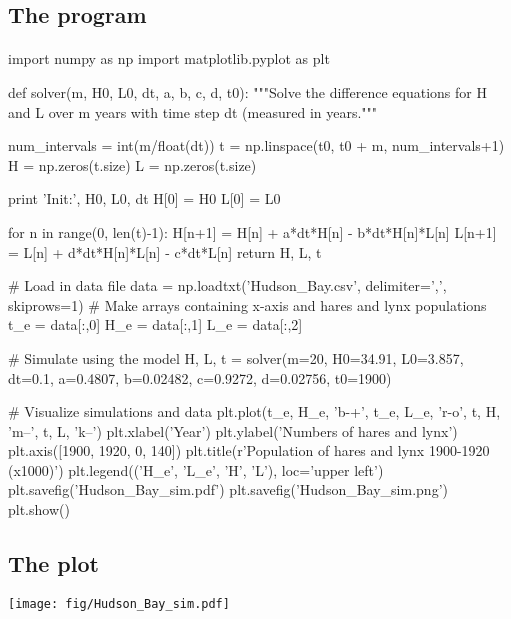 \documentclass[%
twoside,                 %
final,                   %
10pt]{article}
\begin{document}
\noindent



\subsection{The program}


\paragraph{}
\bpypro
import numpy as np
import matplotlib.pyplot as plt

def solver(m, H0, L0, dt, a, b, c, d, t0):
    """Solve the difference equations for H and L over m years
    with time step dt (measured in years."""

    num_intervals = int(m/float(dt))
    t = np.linspace(t0, t0 + m, num_intervals+1)
    H = np.zeros(t.size)
    L = np.zeros(t.size)

    print 'Init:', H0, L0, dt
    H[0] = H0
    L[0] = L0

    for n in range(0, len(t)-1):
        H[n+1] = H[n] + a*dt*H[n] - b*dt*H[n]*L[n]
        L[n+1] = L[n] + d*dt*H[n]*L[n] - c*dt*L[n]
    return H, L, t

# Load in data file
data = np.loadtxt('Hudson_Bay.csv', delimiter=',', skiprows=1)
# Make arrays containing x-axis and hares and lynx populations
t_e = data[:,0]
H_e = data[:,1]
L_e = data[:,2]

# Simulate using the model
H, L, t = solver(m=20, H0=34.91, L0=3.857, dt=0.1,
                 a=0.4807, b=0.02482, c=0.9272, d=0.02756,
                 t0=1900)

# Visualize simulations and data
plt.plot(t_e, H_e, 'b-+', t_e, L_e, 'r-o', t, H, 'm--', t, L, 'k--')
plt.xlabel('Year')
plt.ylabel('Numbers of hares and lynx')
plt.axis([1900, 1920, 0, 140])
plt.title(r'Population of hares and lynx 1900-1920 (x1000)')
plt.legend(('H_e', 'L_e', 'H', 'L'), loc='upper left')
plt.savefig('Hudson_Bay_sim.pdf')
plt.savefig('Hudson_Bay_sim.png')
plt.show()
\epypro



\subsection{The plot}



\centerline{\texttt{[image: fig/Hudson\_Bay\_sim.pdf]}}
\end{document}
